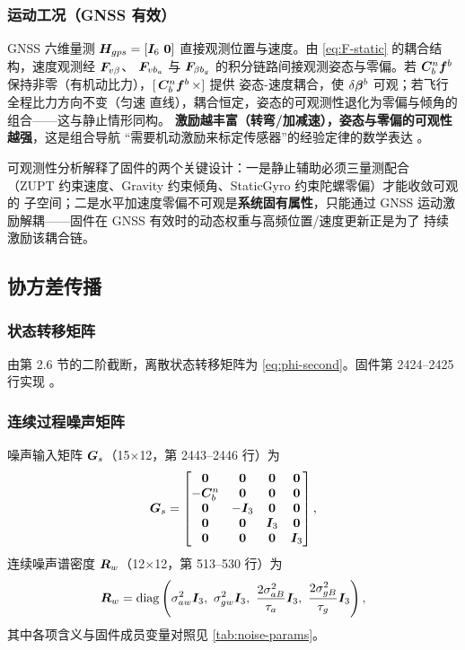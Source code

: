 \subsubsection{运动工况（GNSS 有效）}

GNSS 六维量测 $\m{H}_{gps} = [\m{I}_6\ \m{0}]$ 直接观测位置与速度。由
\cref{eq:F-static} 的耦合结构，速度观测经 $\boldsymbol{F}_{v\beta}$、
$\boldsymbol{F}_{v b_a}$ 与 $\boldsymbol{F}_{\beta b_g}$ 的积分链路间接观测姿态与零偏。若
$\boldsymbol{C}_b^n\boldsymbol{f}^b$ 保持非零（有机动比力），$[\,\boldsymbol{C}_b^n\boldsymbol{f}^b\,\times]$ 提供
姿态-速度耦合，使 $\delta\boldsymbol{\beta}^b$ 可观；若飞行全程比力方向不变（匀速
直线），耦合恒定，姿态的可观测性退化为零偏与倾角的组合——这与静止情形同构。
\textbf{激励越丰富（转弯/加减速），姿态与零偏的可观性越强}，这是组合导航
``需要机动激励来标定传感器''的经验定律的数学表达
\cite{Groves2013}。

\begin{remark}
可观测性分析解释了固件的两个关键设计：一是静止辅助必须三量测配合
（ZUPT 约束速度、Gravity 约束倾角、StaticGyro 约束陀螺零偏）才能收敛可观的
子空间；二是水平加速度零偏不可观是\textbf{系统固有属性}，只能通过 GNSS
运动激励解耦——固件在 GNSS 有效时的动态权重与高频位置/速度更新正是为了
持续激励该耦合链。
\end{remark}

\subsection{协方差传播}

\subsubsection{状态转移矩阵}

由第 2.6 节的二阶截断，离散状态转移矩阵为
\cref{eq:phi-second}。固件第 2424--2425 行实现
。

\subsubsection{连续过程噪声矩阵}

噪声输入矩阵 $\boldsymbol{G}_s$（15$\times$12，第 2443--2446 行）为
\begin{equation}
  \boldsymbol{G}_s = \begin{bmatrix}
    \boldsymbol{0} & \boldsymbol{0} & \boldsymbol{0} & \boldsymbol{0} \\
    -\boldsymbol{C}_b^n & \boldsymbol{0} & \boldsymbol{0} & \boldsymbol{0} \\
    \boldsymbol{0} & -\boldsymbol{I}_3 & \boldsymbol{0} & \boldsymbol{0} \\
    \boldsymbol{0} & \boldsymbol{0} & \boldsymbol{I}_3 & \boldsymbol{0} \\
    \boldsymbol{0} & \boldsymbol{0} & \boldsymbol{0} & \boldsymbol{I}_3
  \end{bmatrix},
  \label{eq:Gs}
\end{equation}
连续噪声谱密度 $\boldsymbol{R}_w$（12$\times$12，第 513--530 行）为
\begin{equation}
  \m{R}_w = \diag\left(\sigma_{aw}^2\m{I}_3,\ \sigma_{gw}^2\m{I}_3,\
    \frac{2\sigma_{aB}^2}{\tau_a}\m{I}_3,\ \frac{2\sigma_{gB}^2}{\tau_g}\m{I}_3\right),
  \label{eq:Rw}
\end{equation}
其中各项含义与固件成员变量对照见 \cref{tab:noise-params}。


